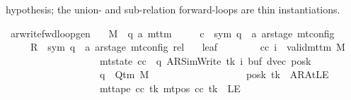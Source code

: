 \begin{isabellebody}
\begin{isamarkuptext}
  hypothesis; the union- and sub-relation forward-loops are thin
  instantiations.%
\end{isamarkuptext}\isamarkuptrue%
\isamarkupfalse%
\ ar{\isacharunderscore}{\kern0pt}write{\isacharunderscore}{\kern0pt}fwd{\isacharunderscore}{\kern0pt}loop{\isacharunderscore}{\kern0pt}gen{\isacharcolon}{\kern0pt}\isanewline
\ \ \ M\ {\isacharcolon}{\kern0pt}{\isacharcolon}{\kern0pt}\ {\isachardoublequoteopen}{\isacharparenleft}{\kern0pt}{\isacharprime}{\kern0pt}q{\isacharcomma}{\kern0pt}\ {\isacharprime}{\kern0pt}a{\isacharparenright}{\kern0pt}\ mttm{\isachardoublequoteclose}\isanewline
\ \ \ \ \ c{}\ {\isacharcolon}{\kern0pt}{\isacharcolon}{\kern0pt}\ {\isachardoublequoteopen}{\isacharparenleft}{\kern0pt}sym{}{\isacharcomma}{\kern0pt}\ {\isacharprime}{\kern0pt}q\ {\isasymtimes}\ {\isacharprime}{\kern0pt}a\ ar{\isacharunderscore}{\kern0pt}stage{\isacharparenright}{\kern0pt}\ mt{\isacharunderscore}{\kern0pt}config{\isachardoublequoteclose}\isanewline
\ \ \ \ \ R{\isacharprime}{\kern0pt}\ {\isacharcolon}{\kern0pt}{\isacharcolon}{\kern0pt}\ {\isachardoublequoteopen}{\isacharparenleft}{\kern0pt}sym{}{\isacharcomma}{\kern0pt}\ {\isacharprime}{\kern0pt}q\ {\isasymtimes}\ {\isacharprime}{\kern0pt}a\ ar{\isacharunderscore}{\kern0pt}stage{\isacharparenright}{\kern0pt}\ mt{\isacharunderscore}{\kern0pt}config\ rel{\isachardoublequoteclose}\isanewline
\ \ \ leaf{\isacharcolon}{\kern0pt}\isanewline
\ \ \ \ \ \ \ \ {\isachardoublequoteopen}{\isasymAnd}cc\ i{\isachardot}{\kern0pt}\ {\isasymlbrakk}\ valid{\isacharunderscore}{\kern0pt}mttm\ M{\isacharsemicolon}{\kern0pt}\isanewline
\ \ \ \ \ \ \ \ \ \ \ \ \ \ \ \ \ \ \ mt{\isacharunderscore}{\kern0pt}state\ cc\ {\isacharequal}{\kern0pt}\ {\isacharparenleft}{\kern0pt}q{\isacharcomma}{\kern0pt}\ AR{\isacharunderscore}{\kern0pt}SimWrite{\isacharcomma}{\kern0pt}\ tk{\isacharcomma}{\kern0pt}\ i{\isacharcomma}{\kern0pt}\ buf{\isacharcomma}{\kern0pt}\ dvec{\isacharcomma}{\kern0pt}\ posk{\isacharparenright}{\kern0pt}{\isacharsemicolon}{\kern0pt}\isanewline
\ \ \ \ \ \ \ \ \ \ \ \ \ \ \ \ \ \ \ q\ {\isasymin}\ Q{\isacharunderscore}{\kern0pt}tm\ M{\isacharsemicolon}{\kern0pt}\isanewline
\ \ \ \ \ \ \ \ \ \ \ \ \ \ \ \ \ \ \ posk\ tk\ {\isasymnoteq}\ AR{\isacharunderscore}{\kern0pt}AtLE{\isacharsemicolon}{\kern0pt}\isanewline
\ \ \ \ \ \ \ \ \ \ \ \ \ \ \ \ \ \ \ mt{\isacharunderscore}{\kern0pt}tape\ cc\ tk\ {\isacharparenleft}{\kern0pt}mt{\isacharunderscore}{\kern0pt}pos\ cc\ tk{\isacharparenright}{\kern0pt}\ {\isasymnoteq}\ LE{}{\isacharsemicolon}{\kern0pt}\isanewline

\end{isabellebody}

